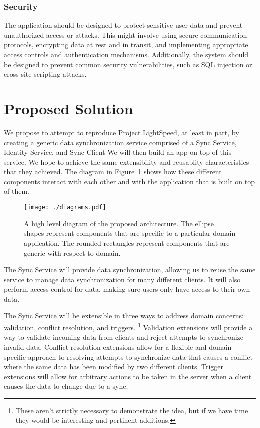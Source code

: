 \documentclass[12pt]{article}
\begin{document}
            \subsubsection{Security}
            The application should be designed to protect sensitive user data and prevent unauthorized access or attacks. This might involve using secure communication protocols, encrypting data at rest and in transit, and implementing appropriate access controls and authentication mechanisms. Additionally, the system should be designed to prevent common security vulnerabilities, such as SQL injection or cross-site scripting attacks.

    \section{Proposed Solution}
    We propose to attempt to reproduce Project LightSpeed, at least in part, by creating a generic data synchronization service comprised of a Sync Service, Identity Service, and Sync Client We will then build an app on top of this service.
    We hope to achieve the same extensibility and reusablity characteristics that they achieved.
    The diagram in Figure~\ref{fig:high-level} shows how these different components interact with each other and with the application that is built on top of them.

    \begin{figure}
        \centering
        \texttt{[image: ./diagrams.pdf]}
        \caption{A high level diagram of the proposed architecture. The ellipse shapes represent components that are specific to a particular domain application. The rounded rectangles represent components that are generic with respect to domain. \label{fig:high-level}}
    \end{figure}

    The Sync Service will provide data synchronization, allowing us to reuse the same service to manage data synchronization for many different clients.
    It will also perform access control for data, making sure users only have access to their own data.

    The Sync Service will be extensible in three ways to address domain concerns: validation, conflict resolution, and triggers.
        \footnote{These aren't strictly necessary to demonstrate the idea, but if we have time they would be interesting and pertinent additions.}
        Validation extensions will provide a way to validate incoming data from clients and reject attempts to synchronize invalid data.
        Conflict resolution extensions allow for a flexible and domain specific approach to resolving attempts to synchronize data that causes a conflict where the same data has been modified by two different clients.
        Trigger extensions will allow for arbitrary actions to be taken in the server when a client causes the data to change due to a sync.
\end{document}
